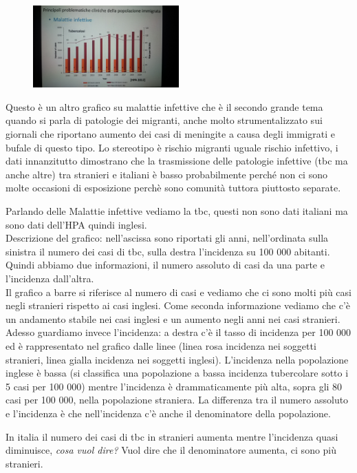 \begin{figure}[!ht]
\centering
	\includegraphics[width=0.5\textwidth]{27/image4.jpeg}
	\end{figure}
	
Questo è un altro grafico su malattie infettive che è il secondo grande
tema quando si parla di patologie dei migranti, anche molto
strumentalizzato sui giornali che riportano aumento dei casi di
meningite a causa degli immigrati e bufale di questo tipo. Lo stereotipo
è rischio migranti uguale rischio infettivo, i dati innanzitutto
dimostrano che la trasmissione delle patologie infettive (tbc ma anche
altre) tra stranieri e italiani è basso probabilmente perché non ci sono
molte occasioni di esposizione perchè sono comunità tuttora piuttosto
separate.

Parlando delle Malattie infettive vediamo la tbc, questi non sono dati
italiani ma sono dati dell'HPA quindi inglesi.\\
Descrizione del grafico: nell'ascissa sono riportati gli anni,
nell'ordinata sulla sinistra il numero dei casi di tbc, sulla destra
l'incidenza su 100 000 abitanti. Quindi abbiamo due informazioni, il
numero assoluto di casi da una parte e l'incidenza dall'altra.\\
Il grafico a barre si riferisce al numero di casi e vediamo che ci sono
molti più casi negli stranieri rispetto ai casi inglesi. Come seconda
informazione vediamo che c'è un andamento stabile nei casi inglesi e un
aumento negli anni nei casi stranieri. Adesso guardiamo invece
l'incidenza: a destra c'è il tasso di incidenza per 100 000 ed è
rappresentato nel grafico dalle linee (linea rosa incidenza nei soggetti
stranieri, linea gialla incidenza nei soggetti inglesi). L'incidenza
nella popolazione inglese è bassa (si classifica una popolazione a bassa
incidenza tubercolare sotto i 5 casi per 100 000) mentre l'incidenza è
drammaticamente più alta, sopra gli 80 casi per 100 000, nella
popolazione straniera. La differenza tra il numero assoluto e
l'incidenza è che nell'incidenza c'è anche il denominatore della
popolazione.

In italia il numero dei casi di tbc in stranieri aumenta mentre
l'incidenza quasi diminuisce, \emph{cosa vuol dire?} Vuol dire che il
denominatore aumenta, ci sono più stranieri.

